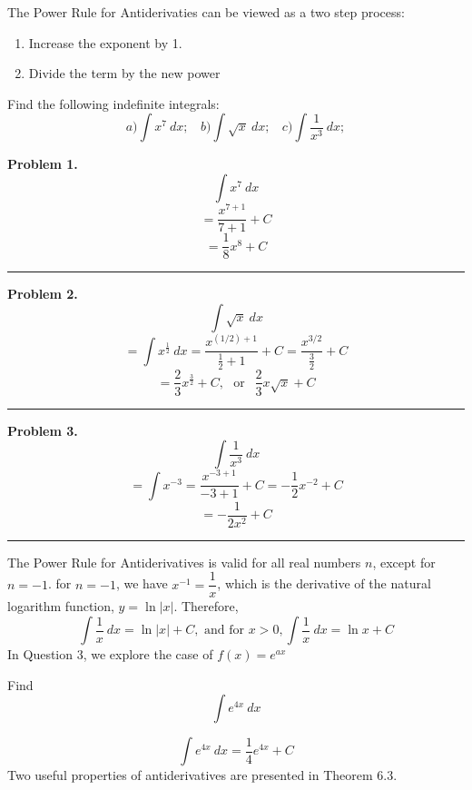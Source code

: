 \documentclass{report}
\begin{document}
\newpage
\noindent The Power Rule for Antiderivaties can be viewed as a two step process:
\bigbreak
\begin{minipage}{0.5\textwidth}
  \hspace{10mm}
\end{minipage}
\begin{minipage}{0.5\textwidth}
  \hspace{-10mm}\vspace{-20mm}\begin{enumerate}
  \item Increase the exponent by 1. 
  \item Divide the term by the new power
\end{enumerate}	
\end{minipage}
\vspace{-20mm}\begin{mdframed}
  \q
Find the following indefinite integrals:
$$ a) \int{x^7}\ dx; \ \ \ \ b) \int{\sqrt{x}}\ dx; \ \ \ \ c) \int{\dfrac{1}{x^3}}\ dx;$$
\end{mdframed}
\bigbreak \noindent
\textbf{Problem 1.}
$$ \int{x^7}\ dx$$
$$ = \dfrac{x^{7+1}}{7+1} + C$$
$$ = \dfrac{1}{8}x^8 + C$$
\bigbreak \noindent
\hrule
\bigbreak \noindent
\textbf{Problem 2.}
$$ \int{\sqrt{x}}\ dx$$
$$ = \int{x^{\frac{1}{2}}}\ dx = \dfrac{x^{(1/2)+1}}{\frac{1}{2}+1}+C = \dfrac{x^{3/2}}{\frac{3}{2}}+C$$ 
$$ = \dfrac{2}{3}x^{\frac{3}{2}}+C, \ \ \ \text{or } \ \ \dfrac{2}{3}x\sqrt{x}+C$$
\bigbreak \noindent
\hrule
\bigbreak \noindent
\textbf{Problem 3.}
$$ \int{\dfrac{1}{x^3}}\ dx$$
$$ = \int{x^{-3}} = \dfrac{x^{-3+1}}{-3+1}+C = -\dfrac{1}{2}x^{-2}+C$$
$$ = -\dfrac{1}{2x^2} +C$$
\bigbreak \noindent
\hrule
\bigbreak \noindent
The Power Rule for Antiderivatives is valid for all real numbers $n$, except for $ n = -1$. for $n=-1$, we have $x^{-1} = \dfrac{1}{x}$, which is the derivative of the natural logarithm function, $ y = \ln{\lvert x\rvert}$. Therefore, 
$$ \int{\dfrac{1}{x}}\ dx = \ln{\lvert x\rvert} +C, \text{ and for } x > 0, \int{\dfrac{1}{x}}\ dx = \ln{x}+C$$
In Question 3, we explore the case of $f(x) = e^{ax}$
\newpage
\begin{mdframed}
\q
Find $$\int{e^{4x}}\ dx$$
\end{mdframed}
\sol
$$\int{e^{4x}}\ dx = \dfrac{1}{4}e^{4x}+C$$
Two useful properties of antiderivatives are presented in Theorem 6.3.
\bigbreak \noindent
{}
\end{document}
